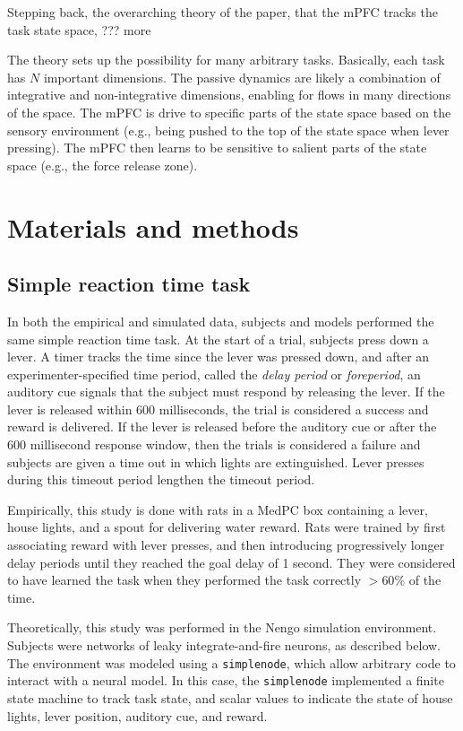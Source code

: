 \documentclass[12pt]{article}
\begin{document}
Stepping back, the overarching theory of the paper,
that the mPFC tracks the task state space, ??? more

The theory sets up the possibility for many arbitrary tasks.
Basically, each task has $N$ important dimensions.
The passive dynamics are likely a combination
of integrative and non-integrative dimensions,
enabling for flows in many directions of the space.
The mPFC is drive to specific parts of the state space
based on the sensory environment (e.g.,
being pushed to the top of the state space when lever pressing).
The mPFC then learns to be sensitive to salient
parts of the state space (e.g.,
the force release zone).

\clearpage

\appendix

\section{Materials and methods}

\subsection{Simple reaction time task}

In both the empirical and simulated data,
subjects and models performed the same simple reaction time task.
At the start of a trial,
subjects press down a lever.
A timer tracks the time since the lever was pressed down,
and after an experimenter-specified time period,
called the \textit{delay period} or \textit{foreperiod},
an auditory cue signals that the subject must respond
by releasing the lever.
If the lever is released within 600 milliseconds,
the trial is considered a success
and reward is delivered.
If the lever is released before the auditory cue
or after the 600 millisecond response window,
then the trials is considered a failure
and subjects are given a time out in which
lights are extinguished.
Lever presses during this timeout period
lengthen the timeout period.

Empirically, this study is done with rats
in a MedPC box containing a lever,
house lights, and a spout for delivering water reward.
Rats were trained by first
associating reward with lever presses,
and then introducing progressively longer
delay periods until they reached the goal delay
of 1 second.
They were considered to have learned the task
when they performed the task correctly $>60\%$
of the time.

Theoretically, this study was performed
in the Nengo simulation environment.
Subjects were networks of leaky integrate-and-fire
neurons, as described below.
The environment was modeled using a
\texttt{simplenode}, which allow arbitrary code
to interact with a neural model.
In this case, the \texttt{simplenode} implemented
a finite state machine to track task state,
and scalar values to indicate the state of
house lights, lever position, auditory cue, and reward.
\end{document}
